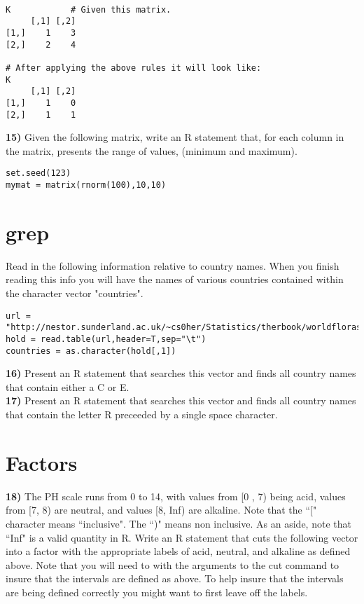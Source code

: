 \documentclass{article}
\begin{document}
\begin{verbatim}

K            # Given this matrix.
     [,1] [,2]
[1,]    1    3
[2,]    2    4 

# After applying the above rules it will look like:
K
     [,1] [,2]
[1,]    1    0
[2,]    1    1

\end{verbatim}

\noindent
{\bf 15)} Given the following matrix, write an R statement that, for each column in the matrix, presents the range of values, (minimum and maximum). 

\begin{verbatim}
set.seed(123)
mymat = matrix(rnorm(100),10,10)
\end{verbatim} 

\section*{grep}
\noindent
Read in the following information relative to country names. When you finish reading this info  you will have the names of various countries contained within the character vector "countries".

\begin{verbatim}
url = "http://nestor.sunderland.ac.uk/~cs0her/Statistics/therbook/worldfloras.txt"
hold = read.table(url,header=T,sep="\t")
countries = as.character(hold[,1])
\end{verbatim}

\noindent
{\bf 16)} Present an R statement that searches this vector and finds all country names that contain either a C or E.
\\

\noindent
{\bf 17)} Present an R statement that searches this vector and finds all country names that contain the letter R preceeded by a single space character.

\section*{Factors}
{\bf 18)} The PH scale runs from 0 to 14, with values from [0 , 7) being acid, values from [7, 8) are neutral, and values [8, Inf) are alkaline. Note that the ``[" character means ``inclusive". The ``)" means non inclusive. As an aside, note that ``Inf" is a valid quantity in R. Write an R statement that cuts the following vector into a factor with the appropriate labels of acid, neutral, and alkaline as defined above. Note that you will need to with the arguments to the cut command to insure that the intervals are defined as above. To help insure that the intervals are being defined correctly you might want to first leave off the labels.
\end{document}
